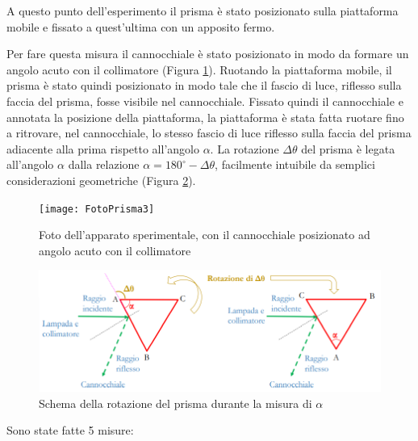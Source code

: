 \documentclass{article}
\begin{document}
A questo punto dell'esperimento il prisma è stato posizionato sulla piattaforma mobile e fissato a quest'ultima con un apposito fermo.

\vspace{5mm}

Per fare questa misura il cannocchiale è stato posizionato in modo da formare un angolo acuto con il collimatore (Figura \ref{angolo_acuto}). Ruotando la piattaforma mobile, il prisma è stato quindi posizionato in modo tale che il fascio di luce, riflesso sulla faccia del prisma, fosse visibile nel cannocchiale. Fissato quindi il cannocchiale e annotata la posizione della piattaforma, la piattaforma è stata fatta ruotare fino a ritrovare, nel cannocchiale, lo stesso fascio di luce riflesso sulla faccia del prisma adiacente alla prima rispetto all'angolo $\alpha$. La rotazione $\Delta \theta$ del prisma è legata all'angolo $\alpha$ dalla relazione $\alpha=180^{\circ}-\Delta \theta$, facilmente intuibile da semplici considerazioni geometriche (Figura \ref{SchemaRiflessione}).

\begin{figure}[h]
  \centering
  \texttt{[image: FotoPrisma3]}
  \caption{Foto dell'apparato sperimentale, con il cannocchiale posizionato ad angolo acuto con il collimatore}
  \label{angolo_acuto}
\end{figure}

\begin{figure}[h]
  \centering
  \includegraphics[width=0.7\linewidth]{Schema_Prisma_2}
  \caption{Schema della rotazione del prisma durante la misura di $\alpha$}
  \label{SchemaRiflessione}
\end{figure}

\pagebreak

Sono state fatte 5 misure:

\vspace{5mm}
\end{document}
